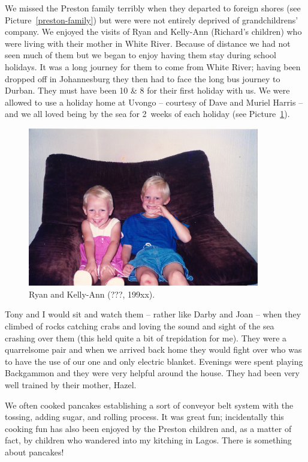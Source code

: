 We missed the Preston family terribly when they departed to foreign
shores (see Picture~\ref{preston-family}) but were were not entirely
deprived of grandchildrens' company. We enjoyed the visits of Ryan and
Kelly-Ann (Richard's children) who were living with their mother in
White River. Because of distance we had not seen much of them but we
began to enjoy having them stay during school holidays. It was a long
journey for them to come from White River; having been dropped off in
Johannesburg they then had to face the long bus journey to
Durban. They must have been 10 \& 8 for their first holiday with
us. We were allowed to use a holiday home at Uvongo -- courtesy of
Dave and Muriel Harris -- and we all loved being by the sea for
2~weeks of each holiday (see Picture~\ref{ryan-kelly-ann}).

\begin{figure}
  \centering
  \includegraphics[width=0.9\textwidth]{photos/ryan-and-kelly-ann}
  \caption{Ryan and Kelly-Ann (???, 199xx).}
  \label{ryan-kelly-ann}
\end{figure}

Tony and I would sit and watch them -- rather like Darby and Joan --
when they climbed of rocks catching crabs and loving the sound and
sight of the sea crashing over them (this held quite a bit of
trepidation for me). They were a quarrelsome pair and when we arrived
back home they would fight over who was to have the use of our one and
only electric blanket. Evenings were spent playing Backgammon and they
were very helpful around the house. They had been very well trained by
their mother, Hazel.

We often cooked pancakes establishing a sort of conveyor belt system
with the tossing, adding sugar, and rolling process. It was great fun;
incidentally this cooking fun has also been enjoyed by the Preston
children and, as a matter of fact, by children who wandered into my
kitching in Lagos. There is something about pancakes!

